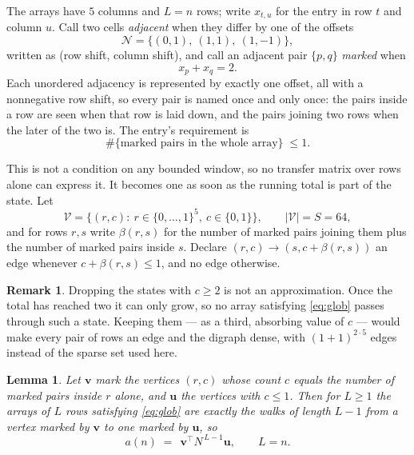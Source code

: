 \documentclass[11pt,a4paper]{article}
\theoremstyle{plain}
\newtheorem{lemma}[theorem]{Lemma}
\theoremstyle{definition}
\newtheorem{remark}[theorem]{Remark}
\begin{document}
The arrays have $5$ columns and $L=n$ rows; write $x_{t,u}$ for the entry in
row $t$ and column $u$. Call two cells \emph{adjacent} when they differ by one of the
offsets
\[
\mathcal N=\{(0,1),\ (1,1),\ (1,-1)\},
\]
written as (row shift, column shift), and call an adjacent pair $\{p,q\}$
\emph{marked} when
\[
x_{p}+x_{q}=2 .
\]
Each unordered adjacency is represented by exactly one offset, all with a nonnegative row
shift, so every pair is named once and only once: the pairs inside a row are seen when
that row is laid down, and the pairs joining two rows when the later of the two is. The
entry's requirement is
\begin{equation}\label{eq:glob}
\#\{\text{marked pairs in the whole array}\}\;\le1.
\end{equation}

This is not a condition on any bounded window, so no transfer matrix over rows alone can
express it. It becomes one as soon as the running total is part of the state. Let
\[
\mathcal V=\bigl\{(r,c):\ r\in\{0,\dots,1\}^{5},\ c\in\{0,1\}\bigr\},
\qquad |\mathcal V|=S=64,
\]
and for rows $r,s$ write $\beta(r,s)$ for the number of marked pairs joining them plus the
number of marked pairs inside $s$. Declare $(r,c)\to(s,c+\beta(r,s))$ an edge whenever
$c+\beta(r,s)\le1$, and no edge otherwise.

\begin{remark}
Dropping the states with $c\ge2$ is not an approximation. Once the total has reached two it
can only grow, so no array satisfying \eqref{eq:glob} passes through such a state. Keeping
them --- as a third, absorbing value of $c$ --- would make every pair of rows an edge and
the digraph dense, with $(1+1)^{2\cdot5}$ edges instead of the sparse set used here.
\end{remark}

\begin{lemma}\label{lem:walk}
Let $\mathbf{v}$ mark the vertices $(r,c)$ whose count $c$ equals the number of marked pairs
inside $r$ alone, and $\mathbf{u}$ the vertices with $c\le1$. Then for $L\ge1$ the arrays
of $L$ rows satisfying \eqref{eq:glob} are exactly the walks of length $L-1$ from a
vertex marked by $\mathbf{v}$ to one marked by $\mathbf{u}$, so
\[
a(n)\;=\;\,\mathbf{v}^{\!\top}N^{\,L-1}\mathbf{u},\qquad L=n .
\]
\end{lemma}
\end{document}
